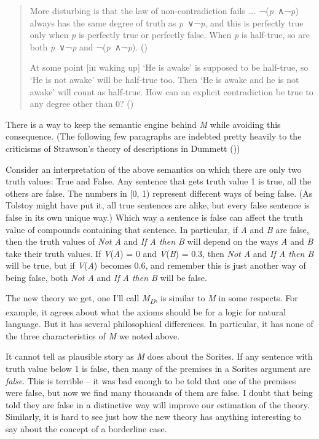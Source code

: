 \documentclass[
  11pt,
  letterpaper,
  DIV=11,
  numbers=noendperiod,
  twoside]{scrartcl}
\begin{document}
\begin{quote}
More disturbing is that the law of non-contradiction fails \ldots.
¬(\emph{p}~∧¬\emph{p}) always has the same degree of truth as
\emph{p}~∨¬\emph{p}, and this is perfectly true only when \emph{p} is
perfectly true or perfectly false. When \emph{p} is half-true, so are
both \emph{p}~∨¬\emph{p} and ¬(\emph{p}~∧¬\emph{p}).
()

At some point {[}in waking up{]} `He is awake' is supposed to be
half-true, so `He is not awake' will be half-true too. Then `He is awake
and he is not awake' will count as half-true. How can an explicit
contradiction be true to any degree other than 0?
()
\end{quote}

There is a way to keep the semantic engine behind \emph{M} while
avoiding this consequence. (The following few paragraphs are indebted
pretty heavily to the criticisms of Strawson's theory of descriptions in
Dummett ())

Consider an interpretation of the above semantics on which there are
only two truth values: True and False. Any sentence that gets truth
value 1 is true, all the others are false. The numbers in {[}0, 1)
represent different ways of being false. (As Tolstoy might have put it,
all true sentences are alike, but every false sentence is false in its
own unique way.) Which way a sentence is false can affect the truth
value of compounds containing that sentence. In particular, if \emph{A}
and \emph{B} are false, then the truth values of \emph{Not A} and
\emph{If A then B} will depend on the ways \emph{A} and \emph{B} take
their truth values. If \emph{V}(\emph{A}) = 0 and \emph{V}(\emph{B}) =
0.3, then \emph{Not A} and \emph{If A then B} will be true, but if
\emph{V}(\emph{A}) becomes 0.6, and remember this is just another way of
being false, both \emph{Not A} and \emph{If A then B} will be false.

The new theory we get, one I'll call \emph{M\textsubscript{D}}, is
similar to \emph{M} in some respects. For example, it agrees about what
the axioms should be for a logic for natural language. But it has
several philosophical differences. In particular, it has none of the
three characteristics of \emph{M} we noted above.

It cannot tell as plausible story as \emph{M} does about the Sorites. If
any sentence with truth value below 1 is false, then many of the
premises in a Sorites argument are \emph{false}. This is terrible -- it
was bad enough to be told that one of the premises were false, but now
we find many thousands of them are false. I doubt that being told they
are false in a distinctive way will improve our estimation of the
theory. Similarly, it is hard to see just how the new theory has
anything interesting to say about the concept of a borderline case.
\end{document}
